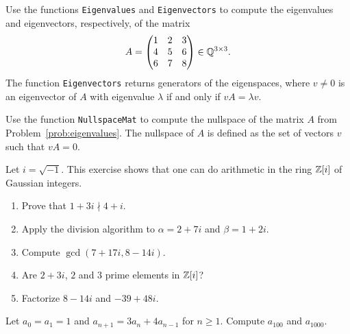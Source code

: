 \begin{prob}
  \label{prob:eigenvalues}
  Use the functions \lstinline{Eigenvalues} and \lstinline{Eigenvectors} to
  compute the eigenvalues and eigenvectors, respectively, of the matrix
  \[
    A=\begin{pmatrix}	
      1 & 2 & 3\\
      4 & 5 & 6\\
      6 & 7 & 8
    \end{pmatrix}\in\mathbb{Q}^{3\times3}.
  \]
  The function \lstinline{Eigenvectors} returns generators of the eigenspaces,
  where $v\ne0$ is an eigenvector of $A$ with eigenvalue $\lambda$ if and only
  if $vA=\lambda v$. 
\end{prob}

\begin{prob}
  Use the function \lstinline{NullspaceMat} to compute the nullspace 
  of the matrix $A$ from Problem~\ref{prob:eigenvalues}. 
  The nullspace of $A$ is defined as the set of vectors $v$ such
  that $vA=0$. 
\end{prob}

\begin{prob}
    Let $i=\sqrt{-1}$.  
    This exercise shows that one can do arithmetic in the
    ring $\mathbb{Z}[i]$ of Gaussian integers. 
    \begin{enumerate}[label=(\alph*)]
        \item Prove that $1+3i\nmid 4+i$. 
        \item Apply the division algorithm to $\alpha=2+7i$ and $\beta=1+2i$.
        \item Compute $\gcd(7+17i,8-14i)$.
        \item Are $2+3i$, $2$ and $3$ prime elements in $\mathbb{Z}[i]$?
        \item Factorize $8-14i$ and $-39+48i$.
    \end{enumerate}
\end{prob}

\begin{prob}
    Let $a_0=a_1=1$ and $a_{n+1}=3a_n+4a_{n-1}$ for $n\geq1$. 
    Compute $a_{100}$ and $a_{1000}$. 
\end{prob}
